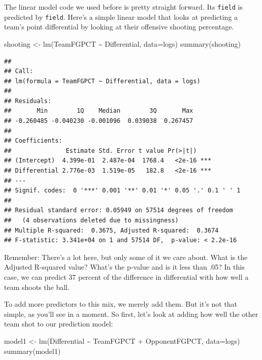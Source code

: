 \documentclass[
]{book}
\newenvironment{Shaded}{\begin{snugshade}}{\end{snugshade}}
\newcommand{\AttributeTok}[1]{\textcolor[rgb]{0.77,0.63,0.00}{#1}}
\newcommand{\FunctionTok}[1]{\textcolor[rgb]{0.00,0.00,0.00}{#1}}
\newcommand{\NormalTok}[1]{#1}
\newcommand{\OtherTok}[1]{\textcolor[rgb]{0.56,0.35,0.01}{#1}}
\newcommand{\SpecialCharTok}[1]{\textcolor[rgb]{0.00,0.00,0.00}{#1}}
\begin{document}
The linear model code we used before is pretty straight forward. Its \texttt{field} is predicted by \texttt{field}. Here's a simple linear model that looks at predicting a team's point differential by looking at their offensive shooting percentage.

\begin{Shaded}
\begin{Highlighting}[]
\NormalTok{shooting }\OtherTok{\textless{}{-}} \FunctionTok{lm}\NormalTok{(TeamFGPCT }\SpecialCharTok{\textasciitilde{}}\NormalTok{ Differential, }\AttributeTok{data=}\NormalTok{logs)}
\FunctionTok{summary}\NormalTok{(shooting)}
\end{Highlighting}
\end{Shaded}

\begin{verbatim}
## 
## Call:
## lm(formula = TeamFGPCT ~ Differential, data = logs)
## 
## Residuals:
##       Min        1Q    Median        3Q       Max 
## -0.260485 -0.040230 -0.001096  0.039038  0.267457 
## 
## Coefficients:
##               Estimate Std. Error t value Pr(>|t|)    
## (Intercept)  4.399e-01  2.487e-04  1768.4   <2e-16 ***
## Differential 2.776e-03  1.519e-05   182.8   <2e-16 ***
## ---
## Signif. codes:  0 '***' 0.001 '**' 0.01 '*' 0.05 '.' 0.1 ' ' 1
## 
## Residual standard error: 0.05949 on 57514 degrees of freedom
##   (4 observations deleted due to missingness)
## Multiple R-squared:  0.3675, Adjusted R-squared:  0.3674 
## F-statistic: 3.341e+04 on 1 and 57514 DF,  p-value: < 2.2e-16
\end{verbatim}

Remember: There's a lot here, but only some of it we care about. What is the Adjusted R-squared value? What's the p-value and is it less than .05? In this case, we can predict 37 percent of the difference in differential with how well a team shoots the ball.

To add more predictors to this mix, we merely add them. But it's not that simple, as you'll see in a moment. So first, let's look at adding how well the other team shot to our prediction model:

\begin{Shaded}
\begin{Highlighting}[]
\NormalTok{model1 }\OtherTok{\textless{}{-}} \FunctionTok{lm}\NormalTok{(Differential }\SpecialCharTok{\textasciitilde{}}\NormalTok{ TeamFGPCT }\SpecialCharTok{+}\NormalTok{ OpponentFGPCT, }\AttributeTok{data=}\NormalTok{logs)}
\FunctionTok{summary}\NormalTok{(model1)}
\end{Highlighting}
\end{Shaded}
\end{document}
